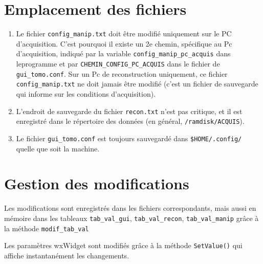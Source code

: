 \documentclass[	french,DIV=calc,%
							paper=a4,%
							fontsize=11pt,%
							twocolumn]{scrartcl}	 					%
\newcommand{\code}[1]{\texttt{#1}}
\begin{document}
\section{Emplacement des fichiers}
\begin{enumerate}
 \item Le fichier  \code{config\_manip.txt} doit être modifié uniquement sur le PC d'acquisition. C'est pourquoi il existe un 2e chemin, spécifique au Pc d'acquisition, indiqué par la variable \code{config\_manip\_pc\_acquis} dans leprogramme et par \code{CHEMIN\_CONFIG\_PC\_ACQUIS} dans le fichier de \code{gui\_tomo.conf}. 
Sur un Pc de reconstruction uniquement, ce fichier \code{config\_manip.txt} ne doit jamais être modifié (c'est un fichier de sauvegarde qui informe sur les conditions d'acquisition).

\item L'endroit de sauvegarde du fichier  \code{recon.txt} n'est pas critique, et il est enregistré dans le répertoire des données (en général, \code{/ramdisk/ACQUIS}). 
\item 
Le fichier \code{gui\_tomo.conf} est toujours sauvegardé dans \code{\$HOME/.config/} quelle que soit la machine. 
\end{enumerate}

\section{Gestion des modifications}
Les modifications sont enregistrés dans les fichiers correspondants, mais aussi en mémoire dans les tableaux  \code{tab\_val\_gui}, \code{tab\_val\_recon}, \code{tab\_val\_manip} grâce à la méthode \code{modif\_tab\_val}

Les paramètres wxWidget sont modifiés grâce à la méthode \code{SetValue()} qui affiche instantanément les changements.
\end{document}

